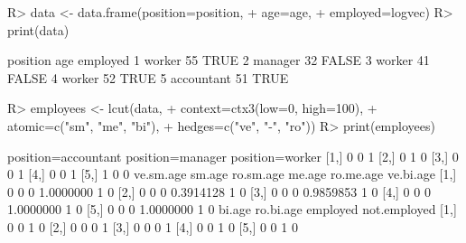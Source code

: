 \begin{Schunk}
% --begin: "lcut.data.frame"
\begin{Sinput}
R> data <- data.frame(position=position,
+                     age=age,
+                     employed=logvec)
R> print(data)
\end{Sinput}
\begin{Soutput}
    position age employed
1     worker  55     TRUE
2    manager  32    FALSE
3     worker  41    FALSE
4     worker  52     TRUE
5 accountant  51     TRUE
\end{Soutput}
\begin{Sinput}
R> employees <- lcut(data,
+       context=ctx3(low=0, high=100),
+       atomic=c("sm", "me", "bi"),
+       hedges=c("ve", "-", "ro"))
R> print(employees)
\end{Sinput}
\begin{Soutput}
     position=accountant position=manager position=worker
[1,]                   0                0               1
[2,]                   0                1               0
[3,]                   0                0               1
[4,]                   0                0               1
[5,]                   1                0               0
     ve.sm.age sm.age ro.sm.age    me.age ro.me.age ve.bi.age
[1,]         0      0         0 1.0000000         1         0
[2,]         0      0         0 0.3914128         1         0
[3,]         0      0         0 0.9859853         1         0
[4,]         0      0         0 1.0000000         1         0
[5,]         0      0         0 1.0000000         1         0
     bi.age ro.bi.age employed not.employed
[1,]      0         0        1            0
[2,]      0         0        0            1
[3,]      0         0        0            1
[4,]      0         0        1            0
[5,]      0         0        1            0
\end{Soutput}
%
% --end: "lcut.data.frame"
\end{Schunk}
